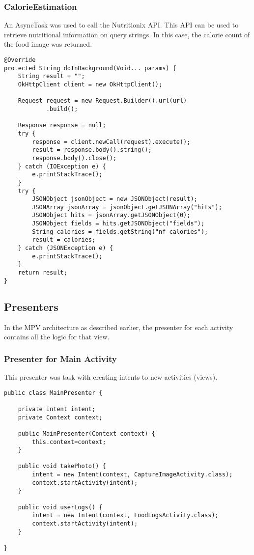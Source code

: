 \subsubsection*{CalorieEstimation}
An AsyncTask was used to call the Nutritionix API.
This API can be used to retrieve nutritional information on query strings.
In this case, the calorie count of the food image was returned.
\begin{lstlisting}[style=Java]
@Override
protected String doInBackground(Void... params) {
    String result = "";
    OkHttpClient client = new OkHttpClient();

    Request request = new Request.Builder().url(url)
            .build();

    Response response = null;
    try {
        response = client.newCall(request).execute();
        result = response.body().string();
        response.body().close();
    } catch (IOException e) {
        e.printStackTrace();
    }
    try {
        JSONObject jsonObject = new JSONObject(result);
        JSONArray jsonArray = jsonObject.getJSONArray("hits");
        JSONObject hits = jsonArray.getJSONObject(0);
        JSONObject fields = hits.getJSONObject("fields");
        String calories = fields.getString("nf_calories");
        result = calories;
    } catch (JSONException e) {
        e.printStackTrace();
    }
    return result;
}
\end{lstlisting}

\subsection*{Presenters}
In the MPV architecture as described earlier, the presenter for each activity contains all the logic for that view.

\subsubsection*{Presenter for Main Activity}
This presenter was task with creating intents to new activities (views).
\begin{lstlisting}[style=Java]
public class MainPresenter {

    private Intent intent;
    private Context context;

    public MainPresenter(Context context) {
        this.context=context;
    }

    public void takePhoto() {
        intent = new Intent(context, CaptureImageActivity.class);
        context.startActivity(intent);
    }

    public void userLogs() {
        intent = new Intent(context, FoodLogsActivity.class);
        context.startActivity(intent);
    }

}
\end{lstlisting}

